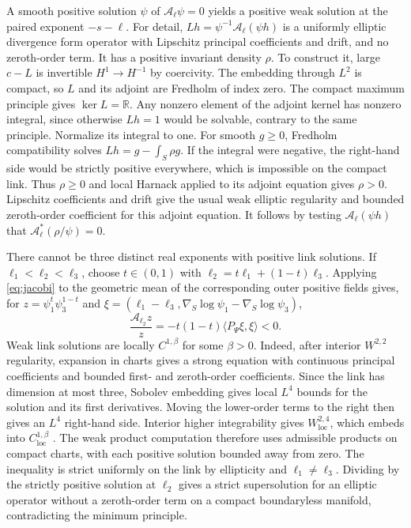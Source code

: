 \documentclass[11pt]{amsart}
\begin{document}
A smooth positive solution \(\psi\) of \(\mathcal A_\ell\psi=0\)
yields a positive weak solution at the paired exponent \(-s-\ell\).
For detail, \(Lh=\psi^{-1}\mathcal A_\ell(\psi h)\) is a uniformly
elliptic divergence form operator with Lipschitz principal coefficients
and drift, and no zeroth-order term. It has a positive invariant
density \(\rho\). To construct it, large \(c-L\) is invertible
\(H^1\to H^{-1}\) by coercivity. The embedding through \(L^2\) is compact,
so \(L\) and its adjoint are Fredholm of index zero. The compact
maximum principle \cite[Theorems~8.19--8.20]{GT} gives \(\ker L=\mathbb R\). Any nonzero element of
the adjoint kernel has nonzero integral, since otherwise \(Lh=1\)
would be solvable, contrary to the same principle. Normalize its
integral to one. For smooth \(g\ge0\), Fredholm compatibility solves
\(Lh=g-\int_S \rho g\). If the integral were negative, the right-hand
side would be strictly positive everywhere, which is impossible on
the compact link. Thus \(\rho\ge0\) and local Harnack applied to its
adjoint equation gives \(\rho>0\). Lipschitz coefficients and drift
give the usual weak elliptic regularity and bounded zeroth-order
coefficient for this adjoint equation. It follows by testing
\(\mathcal A_\ell(\psi h)\) that \(\mathcal A_\ell^*(\rho/\psi)=0\).

There cannot be three distinct real exponents with positive link
solutions. If \(\ell_1<\ell_2<\ell_3\), choose \(t\in(0,1)\) with
\(\ell_2=t\ell_1+(1-t)\ell_3\). Applying \eqref{eq:jacobi} to the geometric mean
of the corresponding outer positive fields gives, for
\(z=\psi_1^t\psi_3^{1-t}\) and
\(\xi=(\ell_1-\ell_3,\nabla_S\log\psi_1-\nabla_S\log\psi_3)\),
\begin{equation}\label{eq:mean}
 \frac{\mathcal A_{\ell_2}z}{z}
  =-t(1-t)\langle P_\Psi\xi,\xi\rangle<0.
\end{equation}
Weak link solutions are locally \(C^{1,\beta}\) for some \(\beta>0\).
Indeed, after interior \(W^{2,2}\) regularity, expansion in charts gives
a strong equation with continuous principal coefficients and bounded
first- and zeroth-order coefficients. Since the link has dimension
at most three, Sobolev embedding gives local \(L^4\) bounds for the
solution and its first derivatives. Moving the lower-order terms
to the right then gives an \(L^4\) right-hand side. Interior
higher integrability gives \(W^{2,4}_{\mathrm{loc}}\), which embeds
into \(C^{1,\beta}_{\mathrm{loc}}\) \cite[Theorems~8.8 and 9.11 and
Lemma~9.16]{GT}. The weak
product computation therefore uses admissible products on compact
charts, with each positive solution bounded away from zero. The inequality is strict uniformly on
the link by ellipticity and \(\ell_1\ne\ell_3\). Dividing by the strictly
positive solution at \(\ell_2\) gives a strict supersolution for
an elliptic operator without a zeroth-order term on a compact
boundaryless manifold, contradicting the minimum principle.
\end{document}
